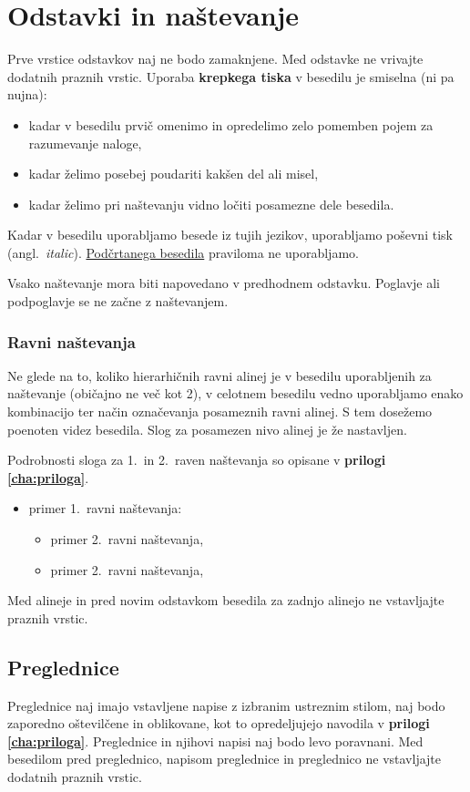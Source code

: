 \section{Odstavki in naštevanje}\label{sec:odstavki}
Prve vrstice odstavkov naj ne bodo zamaknjene. Med odstavke ne vrivajte dodatnih praznih vrstic. Uporaba \textbf{krepkega tiska} v besedilu je smiselna (ni pa nujna):
\begin{itemize}
\item kadar v besedilu prvič omenimo in opredelimo zelo pomemben pojem za razumevanje naloge,
\item kadar želimo posebej poudariti kakšen del ali misel,
\item kadar želimo pri naštevanju vidno ločiti posamezne dele besedila.
\end{itemize}

Kadar v besedilu uporabljamo besede iz tujih jezikov, uporabljamo poševni tisk (angl.~\emph{italic}). \underline{Podčrtanega besedila} praviloma ne uporabljamo.

Vsako naštevanje mora biti napovedano v predhodnem odstavku. Poglavje ali podpoglavje se ne začne z naštevanjem.

\subsubsection{Ravni naštevanja}
Ne glede na to, koliko hierarhičnih ravni alinej je v besedilu uporabljenih za naštevanje (običajno ne več kot 2), v celotnem besedilu vedno uporabljamo enako kombinacijo ter način označevanja posameznih ravni alinej. S tem dosežemo poenoten videz besedila. Slog za posamezen nivo alinej je že nastavljen. 

Podrobnosti sloga za 1.~in 2.~raven naštevanja so opisane v \textbf{prilogi \ref{cha:priloga}}.
\begin{itemize}
\item primer 1.~ravni naštevanja:
\begin{itemize}
\item primer 2.~ravni naštevanja,
\item primer 2.~ravni naštevanja,
\end{itemize}
\end{itemize}
Med alineje in pred novim odstavkom besedila za zadnjo alinejo ne vstavljajte praznih vrstic.


\subsection{Preglednice}\label{sec:preglednice}
Preglednice naj imajo vstavljene napise z izbranim ustreznim stilom, naj bodo zaporedno oštevilčene in oblikovane, kot to opredeljujejo navodila v \textbf{prilogi \ref{cha:priloga}}. Preglednice in njihovi napisi naj bodo levo poravnani. Med besedilom pred preglednico, napisom preglednice in preglednico ne vstavljajte dodatnih praznih vrstic.

